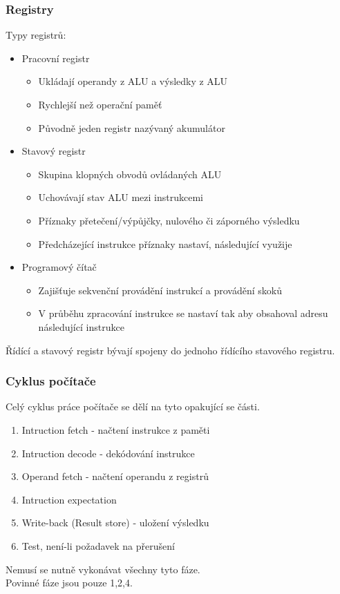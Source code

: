\subsubsection*{Registry}
Typy registrů:
\begin{itemize}
    \item Pracovní registr
          \begin{itemize}
              \item Ukládají operandy z ALU a výsledky z ALU
              \item Rychlejší než operační paměť
              \item Původně jeden registr nazývaný akumulátor
          \end{itemize}
    \item Stavový registr
          \begin{itemize}
              \item Skupina klopných obvodů ovládaných ALU
              \item Uchovávají stav ALU mezi instrukcemi
              \item Příznaky přetečení/výpůjčky, nulového či záporného výsledku
              \item Předcházející instrukce příznaky nastaví, následující využije
          \end{itemize}
    \item Programový čítač
          \begin{itemize}
              \item Zajišťuje sekvenční provádění instrukcí a provádění skoků
              \item V průběhu zpracování instrukce se nastaví tak aby obsahoval adresu následující instrukce
          \end{itemize}
\end{itemize}
Řídící a stavový registr bývají spojeny do jednoho řídícího stavového registru.\\

\subsubsection{Cyklus počítače}
Celý cyklus práce počítače se dělí na tyto opakující se části.
\begin{enumerate}
    \item Intruction fetch - načtení instrukce z paměti
    \item Intruction decode - dekódování instrukce
    \item Operand fetch - načtení operandu z registrů
    \item Intruction expectation
    \item Write-back (Result store) - uložení výsledku
    \item Test, není-li požadavek na přerušení
\end{enumerate}
Nemusí se nutně vykonávat všechny tyto fáze.\\
Povinné fáze jsou pouze 1,2,4.


